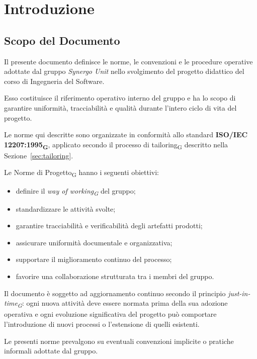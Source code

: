 
\section{Introduzione}

\subsection{Scopo del Documento}

Il presente documento definisce le norme, le convenzioni e le procedure operative adottate dal gruppo \textit{Synergo Unit} nello svolgimento del progetto didattico del corso di Ingegneria del Software.

Esso costituisce il riferimento operativo interno del gruppo e ha lo scopo di garantire uniformità, tracciabilità e qualità durante l'intero ciclo di vita del progetto.

Le norme qui descritte sono organizzate in conformità allo standard \textbf{ISO/IEC 12207:1995\textsubscript{G}}, applicato secondo il processo di tailoring\textsubscript{G} descritto nella Sezione~\ref{sec:tailoring}.

Le Norme di Progetto\textsubscript{G} hanno i seguenti obiettivi:
\begin{itemize}
    \item definire il \textit{way of working\textsubscript{G}} del gruppo;
    \item standardizzare le attività svolte;
    \item garantire tracciabilità e verificabilità degli artefatti prodotti;
    \item assicurare uniformità documentale e organizzativa;
    \item supportare il miglioramento continuo del processo;
    \item favorire una collaborazione strutturata tra i membri del gruppo.
\end{itemize}

Il documento è soggetto ad aggiornamento continuo secondo il principio \textit{just-in-time\textsubscript{G}}: ogni nuova attività deve essere normata prima della sua adozione operativa e ogni evoluzione significativa del progetto può comportare l'introduzione di nuovi processi o l'estensione di quelli esistenti.

Le presenti norme prevalgono su eventuali convenzioni implicite o pratiche informali adottate dal gruppo.

